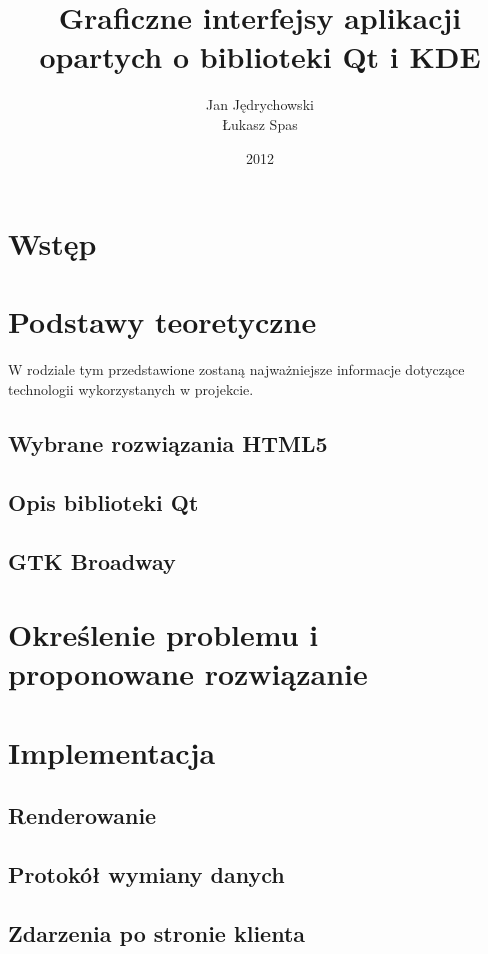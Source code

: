 \documentclass[polish]{inz}
\title{Graficzne interfejsy aplikacji opartych o biblioteki Qt i KDE}
\author{Jan Jędrychowski\\Łukasz Spas}
\date{2012}
\begin{document}
\maketitle

\chapter{Wstęp}


\chapter{Podstawy teoretyczne}
W rodziale tym przedstawione zostaną najważniejsze informacje dotyczące technologii wykorzystanych w projekcie. 

\section{Wybrane rozwiązania HTML5}


\section{Opis biblioteki Qt}


\section{GTK Broadway}


\chapter{Określenie problemu i proponowane rozwiązanie}


\chapter{Implementacja}
\section{Renderowanie}

\section{Protokół wymiany danych}
\label{data_protocol}

\section{Zdarzenia po stronie klienta}
\label{client_events}

\end{document}
